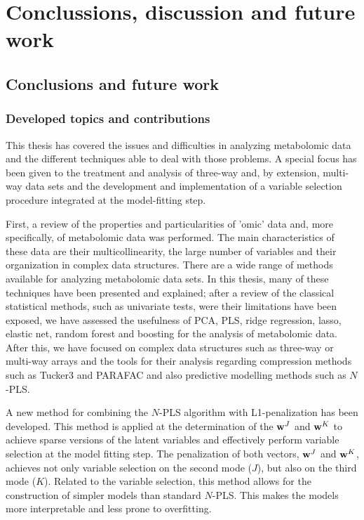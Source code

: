 \part{Conclussions, discussion and future work}
\chapter[Conclusions]{Conclusions and future work}

\section{Developed topics and contributions}
This thesis has covered the issues and difficulties in analyzing metabolomic data and the different techniques able to deal with those problems. A special focus has been given to the treatment and analysis of three-way and, by extension, multi-way data sets and the development and implementation of a variable selection procedure integrated at the model-fitting step.

First, a review of the properties and particularities of 'omic' data and, more specifically, of metabolomic data was performed. The main characteristics of these data are their multicollinearity, the large number of variables and their organization in complex data structures. There are a wide range of methods available for analyzing metabolomic data sets. In this thesis, many of these techniques have been presented and explained; after a review of the classical statistical methods, such as univariate tests, were their limitations have been exposed, we have assessed the usefulness of PCA, PLS, ridge regression, lasso, elastic net, random forest and boosting for the analysis of metabolomic data. After this, we have focused on complex data structures such as three-way or multi-way arrays and the tools for their analysis regarding compression methods such as Tucker3 and PARAFAC and also predictive modelling methods such as $N$-PLS.

A new method for combining the $N$-PLS algorithm with L1-penalization has been developed. This method is applied at the determination of the $\textbf{\text{w}}^J$ and $\textbf{\text{w}}^K$ to achieve sparse versions of the latent variables and effectively perform variable selection at the model fitting step. The penalization of both vectors, $\textbf{\text{w}}^J$ and $\textbf{\text{w}}^K$, achieves not only variable selection on the second mode ($J$), but also on the third mode ($K$). Related to the variable selection, this method allows for the construction of simpler models than standard $N$-PLS. This makes the models more interpretable and less prone to overfitting.


